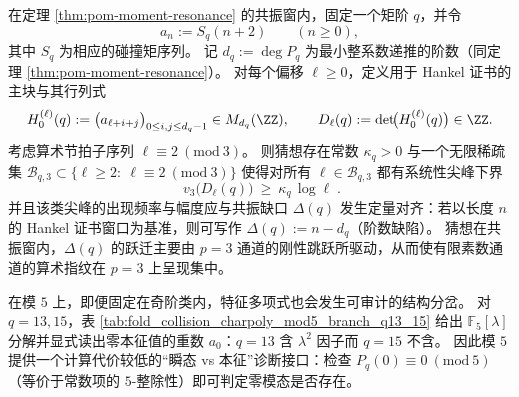 \begin{conjecture}\label{conj:pom-resonance-3adic-beatpoint-hankel-spike-gap-alignment}
在定理 \ref{thm:pom-moment-resonance} 的共振窗内，固定一个矩阶 \(q\)，并令
\[
a_n:=S_q(n+2)\qquad(n\ge 0),
\]
其中 \(S_q\) 为相应的碰撞矩序列。
记 \(d_q:=\deg P_q\) 为最小整系数递推的阶数（同定理 \ref{thm:pom-moment-resonance}）。
对每个偏移 \(\ell\ge 0\)，定义用于 Hankel 证书的主块与其行列式
\[
H_0^{(\ell)}(q):=\bigl(a_{\ell+i+j}\bigr)_{0\le i,j\le d_q-1}\in M_{d_q}(\ZZ),
\qquad
D_\ell(q):=\det\!\bigl(H_0^{(\ell)}(q)\bigr)\in\ZZ.
\]
考虑算术节拍子序列 \(\ell\equiv 2\ (\mathrm{mod}\ 3)\)。
则猜想存在常数 \(\kappa_q>0\) 与一个无限稀疏集
\(
\mathcal B_{q,3}\subset\{\ell\ge 2:\ \ell\equiv 2\ (\mathrm{mod}\ 3)\}
\)
使得对所有 \(\ell\in\mathcal B_{q,3}\) 都有系统性尖峰下界
\[
\boxed{\;
v_3\bigl(D_\ell(q)\bigr)\ \ge\ \kappa_q\,\log \ell\; }.
\]
并且该类尖峰的出现频率与幅度应与共振缺口 \(\Delta(q)\) 发生定量对齐：若以长度 \(n\) 的 Hankel 证书窗口为基准，则可写作 \(\Delta(q):=n-d_q\)（阶数缺陷）。
猜想在共振窗内，\(\Delta(q)\) 的跃迁主要由 \(p=3\) 通道的刚性跳跃所驱动，从而使有限素数通道的算术指纹在 \(p=3\) 上呈现集中。
\end{conjecture}

\begin{remark}\label{rem:pom-charpoly-mod5-branch}
在模 \(5\) 上，即便固定在奇阶类内，特征多项式也会发生可审计的结构分岔。
对 \(q=13,15\)，表 \ref{tab:fold_collision_charpoly_mod5_branch_q13_15} 给出 \(\mathbb{F}_5[\lambda]\) 分解并显式读出零本征值的重数 \(a_0\)：\(q=13\) 含 \(\lambda^2\) 因子而 \(q=15\) 不含。
因此模 \(5\) 提供一个计算代价较低的“瞬态 vs 本征”诊断接口：检查 \(P_q(0)\equiv 0\ (\mathrm{mod}\ 5)\)（等价于常数项的 \(5\)-整除性）即可判定零模态是否存在。
\end{remark}

